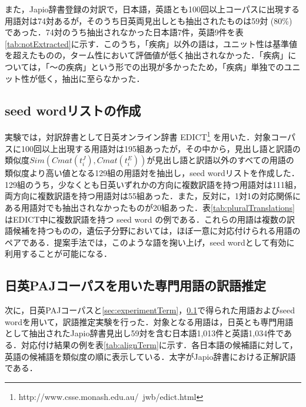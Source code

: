 \documentclass[japanese]{jnlp_1.3e}
\begin{document}
また，Japio辞書登録の対訳で，日本語，英語とも100回以上コーパスに出現する用語対は74対あるが，そのうち日英両見出しとも抽出されたものは59対 (80\%) であった．74対のうち抽出されなかった日本語7件，英語9件を表\ref{tab:notExtracted}に示す．このうち，「疾病」以外の語は，ユニット性は基準値を超えたものの，ターム性において評価値が低く抽出されなかった．「疾病」については，「〜の疾病」という形での出現が多かったため，「疾病」単独でのユニット性が低く，抽出に至らなかった．


\begin{table}[p]

\par\vspace{\baselineskip}

\end{table}

\subsection{seed wordリストの作成}\label{sec:experimentSeedWord}

実験では，対訳辞書として日英オンライン辞書 EDICT\footnote{ http://www.csse.monash.edu.au/~jwb/edict.html } を用いた．対象コーパスに100回以上出現する用語対は195組あったが，その中から，見出し語と訳語の類似度$\mathit{Sim}(\mathit{Cmat}(t^{J}_{i}),\mathit{Cmat}(t^{E}_{i}))$が見出し語と訳語以外のすべての用語の類似度より高い値となる129組の用語対を抽出し，seed wordリストを作成した．129組のうち，少なくとも日英いずれかの方向に複数訳語を持つ用語対は111組，両方向に複数訳語を持つ用語対は55組あった．また，反対に，1対1の対応関係にある用語対でも抽出されなかったものが20組あった．表\ref{tab:pluralTranslations}はEDICT中に複数訳語を持つ seed word の例である．これらの用語は複数の訳語候補を持つものの，遺伝子分野においては，ほぼ一意に対応付けられる用語のペアである．提案手法では，このような語を掬い上げ，seed wordとして有効に利用することが可能になる．

\begin{table}[b]

\end{table}


\subsection{日英PAJコーパスを用いた専門用語の訳語推定}
\label{sec:experimentPAJ-PAJ}

次に，日英PAJコーパスと\ref{sec:experimentTerm}，\ref{sec:experimentSeedWord}で得られた用語およびseed wordを用いて，訳語推定実験を行った．対象となる用語は，日英とも専門用語として抽出されたJapio辞書見出し59対を含む日本語1,013件と英語1,034件である．対応付け結果の例を表\ref{tab:alignTerm}に示す．各日本語の候補語に対して，英語の候補語を類似度の順に表示している．太字がJapio辞書における正解訳語である．
\end{document}
